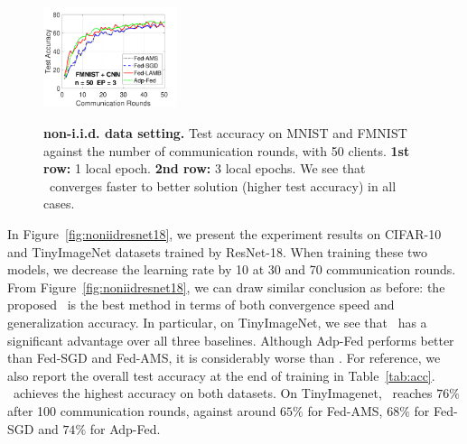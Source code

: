 \documentclass[manuscript,screen,review]{acmart}
\begin{document}
\begin{figure}[t]
\begin{center}
{        \hspace{-0.1in}\includegraphics[width=0.35\textwidth]{new_fmnist_mnist_fig/fmnist_testerror_cnn_ep3_iid0_reddi.pdf}
        }
    \end{center}
	\caption{\textbf{non-i.i.d. data setting.} Test accuracy on MNIST and FMNIST against the number of communication rounds, with 50 clients. \textbf{1st row:} 1 local epoch. \textbf{2nd row:} 3 local epochs. We see that \algo\ converges faster to better solution (higher test accuracy) in all cases.}
	\label{fig:noniid}
\end{figure}

\clearpage

In Figure~\ref{fig:noniidresnet18}, we present the experiment results on CIFAR-10 and TinyImageNet datasets trained by ResNet-18. When training these two models, we decrease the learning rate by 10 at 30 and 70 communication rounds. From Figure~\ref{fig:noniidresnet18}, we can draw similar conclusion as before: the proposed \algo\ is the best method in terms of both convergence speed and generalization accuracy. In particular, on TinyImageNet, we see that \algo\ has a significant advantage over all three baselines. Although Adp-Fed performs better than Fed-SGD and Fed-AMS, it is considerably worse than \algo. For reference, we also report the overall test accuracy at the end of training in Table~\ref{tab:acc}. \algo\ achieves the highest accuracy on both datasets. On TinyImagenet, \algo\ reaches $76\%$ after 100 communication rounds, against around $65\%$ for Fed-AMS, $68\%$ for Fed-SGD and $74\%$ for Adp-Fed.
\end{document}
